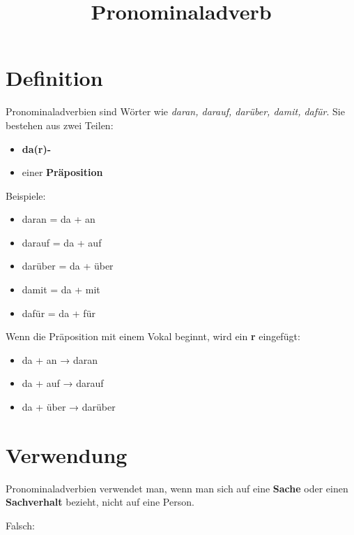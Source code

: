 \documentclass[a4paper]{article}
\title{Pronominaladverb}
\date{}
\begin{document}
    \maketitle
    
    
    \section{Definition}
        
        Pronominaladverbien sind Wörter wie \textit{daran, darauf, darüber, damit, dafür}.
        Sie bestehen aus zwei Teilen:
        
        \begin{itemize}
            \item \textbf{da(r)-}
            \item einer \textbf{Präposition}
        \end{itemize}
        
        Beispiele:
        
        \begin{itemize}
            \item daran = da + an
            \item darauf = da + auf
            \item darüber = da + über
            \item damit = da + mit
            \item dafür = da + für
        \end{itemize}
        
        Wenn die Präposition mit einem Vokal beginnt, wird ein \textbf{r} eingefügt:
        
        \begin{itemize}
            \item da + an → daran
            \item da + auf → darauf
            \item da + über → darüber
        \end{itemize}
    
    
    \section{Verwendung}
        
        Pronominaladverbien verwendet man, wenn man sich auf eine \textbf{Sache} oder einen \textbf{Sachverhalt} bezieht, nicht auf eine Person.
        
        Falsch:
        
\end{document}
